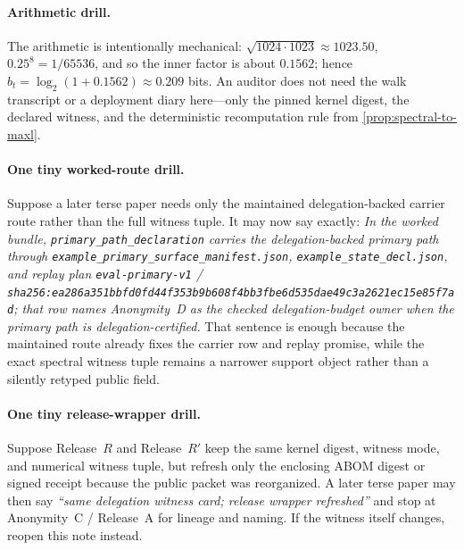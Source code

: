 \documentclass[11pt]{article}
\begin{document}
\paragraph{Arithmetic drill.}
The arithmetic is intentionally mechanical: $\sqrt{1024\cdot 1023}\approx 1023.50$, $0.25^8=1/65536$, and so the inner factor is about $0.1562$; hence $b_t=\log_2(1+0.1562)\approx 0.209$ bits. An auditor does not need the walk transcript or a deployment diary here---only the pinned kernel digest, the declared witness, and the deterministic recomputation rule from \cref{prop:spectral-to-maxl}.


\paragraph{One tiny worked-route drill.}
Suppose a later terse paper needs only the maintained delegation-backed carrier route rather than the full witness tuple. It may now say exactly: \emph{In the worked bundle, \texttt{primary\_path\_declaration} carries the delegation-backed primary path through \nolinkurl{example\_primary\_surface\_manifest.json}, \nolinkurl{example\_state\_decl.json}, and replay plan \texttt{eval-primary-v1} / \texttt{sha256:ea286a351bbfd0fd44f353b9b608f4bb3fbe6d535dae49c3a2621ec15e85f7ad}; that row names Anonymity~D as the checked delegation-budget owner when the primary path is delegation-certified.} That sentence is enough because the maintained route already fixes the carrier row and replay promise, while the exact spectral witness tuple remains a narrower support object rather than a silently retyped public field.\cite{series:workedexample}

\paragraph{One tiny release-wrapper drill.}
Suppose Release~$R$ and Release~$R'$ keep the same kernel digest, witness mode, and numerical witness tuple, but refresh only the enclosing ABOM digest or signed receipt because the public packet was reorganized. A later terse paper may then say \emph{``same delegation witness card; release wrapper refreshed''} and stop at Anonymity~C / Release~A for lineage and naming. If the witness itself changes, reopen this note instead.\cite{series:abomoinl,series:releaseA}
\end{document}
